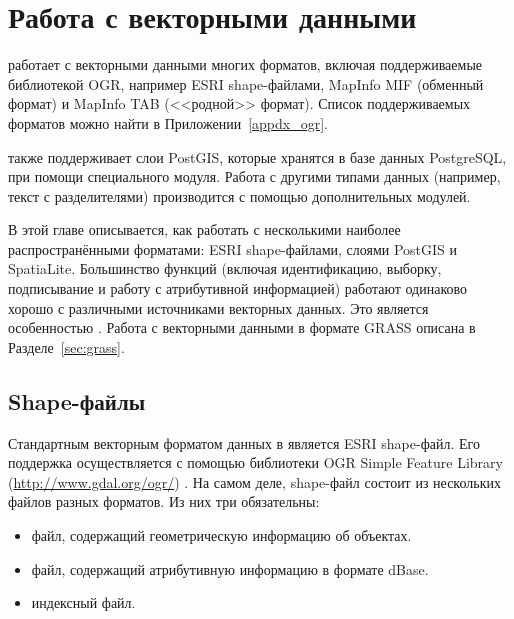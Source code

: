 
\chapter{Работа с векторными данными}\label{label_workingvector}


\qg работает с векторными данными многих форматов, включая
поддерживаемые библиотекой OGR, например ESRI shape-файлами,
MapInfo MIF (обменный формат)
и MapInfo TAB (<<родной>> формат).
Список поддерживаемых форматов можно найти в Приложении~\ref{appdx_ogr}.

\qg также поддерживает слои PostGIS,
которые хранятся в базе данных PostgreSQL, при помощи специального модуля.
Работа с другими типами данных (например, текст с разделителями)
производится с помощью дополнительных модулей.

В этой главе описывается, как работать с несколькими наиболее
распространёнными форматами: ESRI shape-файлами, слоями PostGIS и SpatiaLite.
Большинство функций \qg (включая идентификацию, выборку, подписывание
и работу с атрибутивной информацией) работают одинаково хорошо с различными
источниками векторных данных. Это является особенностью \qg .
Работа с векторными данными в формате GRASS описана в Разделе~\ref{sec:grass}.

\section{Shape-файлы}

Стандартным векторным форматом данных в \qg является ESRI shape-файл. Его
поддержка осуществляется с помощью библиотеки OGR Simple Feature Library
(\url{http://www.gdal.org/ogr/}) . На самом деле, shape-файл
состоит из нескольких файлов разных форматов. Из них три
обязательны: 

\begin{itemize}[label=--]
\item {} файл, содержащий геометрическую информацию об объектах.
\item {} файл, содержащий атрибутивную информацию в
формате dBase.
\item {} индексный файл.
\end{itemize}

